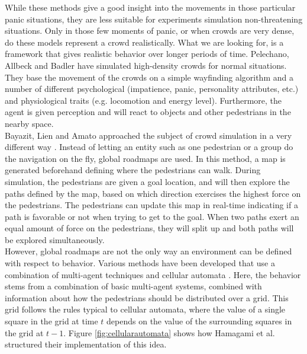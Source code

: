 \documentclass[11pt, a4paper]{book}
\begin{document}
While these methods give a good insight into the movements in those particular panic situations, they are less suitable for experiments simulation  non-threatening situations. Only in those few moments of panic, or when crowds are very dense, do these models represent a crowd realistically. What we are looking for, is a framework that gives realistic behavior over longer periods of time. Pelechano, Allbeck and Badler \cite{Pelechano:2007:CIA:1272690.1272705} have simulated high-density crowds for normal situations. They base the movement of the crowds on a simple wayfinding algorithm and a number of different psychological (impatience, panic, personality attributes, etc.) and physiological traits (e.g. locomotion and energy level). Furthermore, the agent is given perception and will react to objects and other pedestrians in the nearby space.\\
Bayazit, Lien and Amato approached the subject of crowd simulation in a very different way \cite{Bayazit02bettergroup}. Instead of letting an entity such as one pedestrian or a group do the navigation on the fly, global roadmaps are used. In this method, a map is generated beforehand defining where the pedestrians can walk. During simulation, the pedestrians are given a goal location, and will then explore the paths defined by the map, based on which direction exercises the highest force on the pedestrians. The pedestrians can update this map in real-time indicating if a path is favorable or not when trying to get to the goal. When two paths exert an equal amount of force on the pedestrians, they will split up and both paths will be explored simultaneously.\\
However, global roadmaps are not the only way an environment can be defined with respect to behavior. Various methods have been developed that use a combination of multi-agent techniques and cellular automata \cite{Dijkstra00amulti-agent}\cite{1241047}. Here, the behavior stems from a combination of basic multi-agent systems, combined with information about how the pedestrians should be distributed over a grid. This grid follows the rules typical to cellular automata, where the value of a single square in the grid at time $t$ depends on the value of the surrounding squares in the grid at $t-1$. Figure \ref{fig:cellularautomata} shows how Hamagami et al. structured their implementation of this idea.
\end{document}
